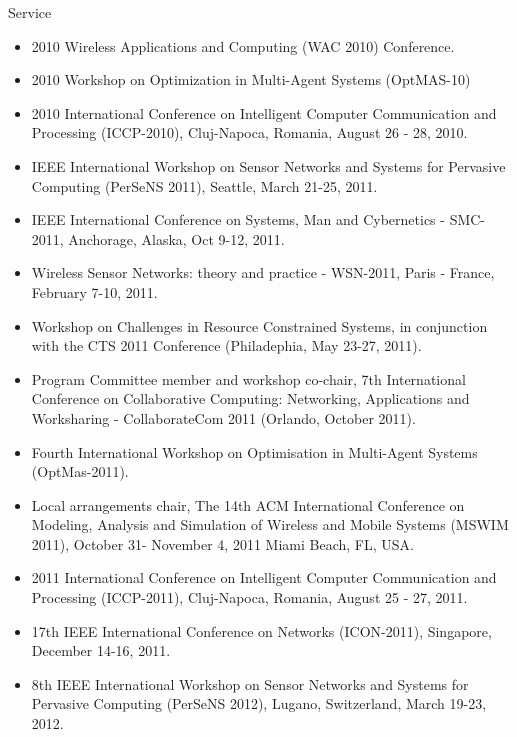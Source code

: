 \begin{category}{Service}
\begin{itemize}
\item 2010 Wireless Applications and
Computing (WAC 2010) Conference.

\item 2010 Workshop on Optimization in Multi-Agent Systems (OptMAS-10)

\item 2010 International Conference on Intelligent
Computer Communication and Processing (ICCP-2010), Cluj-Napoca, Romania, August 26 - 28, 2010.

\item IEEE International Workshop
on Sensor Networks and Systems for Pervasive Computing (PerSeNS 2011),
Seattle, March 21-25, 2011.

\item IEEE International Conference on Systems, Man and Cybernetics - SMC-2011, Anchorage, Alaska, Oct 9-12, 2011.

\item Wireless Sensor Networks: theory and practice - WSN-2011, Paris - France, February 7-10, 2011.

\item Workshop on Challenges in Resource Constrained Systems, in conjunction with the CTS 2011 Conference (Philadephia, May 23-27, 2011).

\item Program Committee member and workshop co-chair, 7th International Conference on Collaborative Computing: Networking, Applications and Worksharing - CollaborateCom 2011 (Orlando, October 2011).

\item Fourth International Workshop on Optimisation in Multi-Agent Systems (OptMas-2011).

\item Local arrangements chair,  The 14th ACM International Conference on Modeling, Analysis and Simulation of Wireless and Mobile Systems (MSWIM 2011), October 31- November 4, 2011
Miami Beach, FL, USA.

\item 2011 International Conference on Intelligent
Computer Communication and Processing (ICCP-2011), Cluj-Napoca, Romania, August 25 - 27, 2011.

\item 17th IEEE International Conference on Networks (ICON-2011), Singapore, December 14-16, 2011.

\item 8th IEEE International Workshop on Sensor Networks and Systems for Pervasive Computing (PerSeNS 2012), Lugano, Switzerland, March 19-23, 2012.


\end{itemize}
\end{category}
